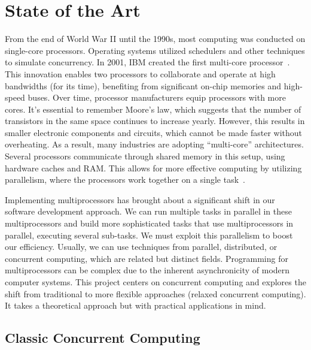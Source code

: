 \chapter{\label{chapter:2_State_of_art}State of the Art}

From the end of World War II until the 1990s, most computing was conducted on single-core processors. Operating systems utilized schedulers and other techniques to simulate concurrency. In 2001, IBM created the first multi-core processor~\cite{ibmIBM100Power}. This innovation enables two processors to collaborate and operate at high bandwidths (for its time), benefiting from significant on-chip memories and high-speed buses. Over time, processor manufacturers equip processors with more cores. It's essential to remember Moore's law, which suggests that the number of transistors in the same space continues to increase yearly. However, this results in smaller electronic components and circuits, which cannot be made faster without overheating. As a result, many industries are adopting ``multi-core'' architectures. Several processors communicate through shared memory in this setup, using hardware caches and RAM. This allows for more effective computing by utilizing parallelism, where the processors work together on a single task~\cite{DBLP_books_daglib_0020056}.

Implementing multiprocessors has brought about a significant shift in our software development approach. We can run multiple tasks in parallel in these multiprocessors and build more sophisticated tasks that use multiprocessors in parallel, executing several sub-tasks. We must exploit this parallelism to boost our efficiency. Usually, we can use techniques from parallel, distributed, or concurrent computing, which are related but distinct fields. Programming for multiprocessors can be complex due to the inherent asynchronicity of modern computer systems. This project centers on concurrent computing and explores the shift from traditional to more flexible approaches (relaxed concurrent computing). It takes a theoretical approach but with practical applications in mind.

\section{\label{section:classic-concurrent}Classic Concurrent Computing}

